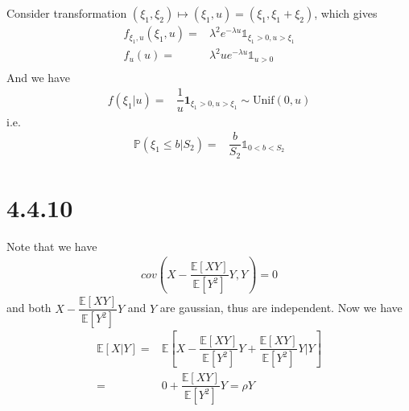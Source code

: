 \documentclass[11pt,a4paper]{ctexart}
\numberwithin{equation}{section}%
\begin{document}
\subsection{}
Consider transformation $ (\xi _1,\xi _2)\mapsto (\xi _1, u)=(\xi _1,\xi _1+\xi _2) $, which gives
\begin{align*}
    f_{\xi _1,u}(\xi _1,u)=& \lambda ^2e^{-\lambda u}\mathbb{1}_{ \xi _1>0,u>\xi _1 }\\
    f_u(u)=&\lambda ^2 u e^{-\lambda u} \mathbb{1}_{ u>0 }\\ 
\end{align*}
And we have
\begin{align*}
    f(\xi _1|u)=&\dfrac{ 1 }{ u } \mathbf{1}_{ \xi _1>0,u>\xi _1 }\sim \mathrm{ Unif }(0,u)  
\end{align*}
i.e.
\begin{align*}
    \mathbb{P}\left( \xi _1\leq b|S_2 \right) =& \dfrac{ b }{ S_2 }\mathbb{1}_{ 0<b<S_2 } 
\end{align*}

\section{4.4.10}

Note that we have
\begin{align*}
    cov(X-\dfrac{ \mathbb{E}\left[ XY \right]  }{ \mathbb{E}\left[ Y^2 \right]  }Y ,Y) =0 
\end{align*}
and both $ X-\dfrac{ \mathbb{E}\left[ XY \right]  }{ \mathbb{E}\left[ Y^2 \right]  }Y $ and $ Y $ are gaussian, thus are independent. Now we have
\begin{align*}
    \mathbb{E}\left[ X|Y \right] =&\mathbb{E}\left[ X-\dfrac{ \mathbb{E}\left[ XY \right]  }{ \mathbb{E}\left[ Y^2 \right]  }Y + \dfrac{ \mathbb{E}\left[ XY \right]  }{ \mathbb{E}\left[ Y^2 \right]  }Y |Y  \right]  \\
    =& 0 + \dfrac{ \mathbb{E}\left[ XY \right]  }{ \mathbb{E}\left[ Y^2 \right]  }Y= \rho Y                                                 
\end{align*}
\end{document}
